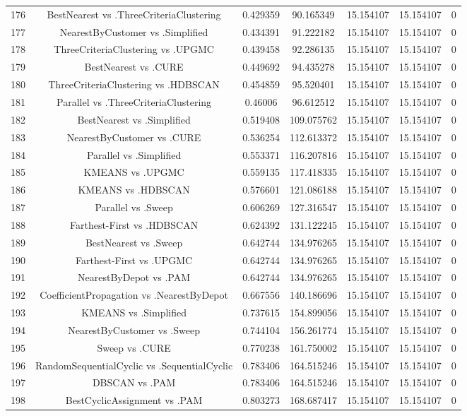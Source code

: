 \documentclass[a4paper,10pt]{article}
\begin{document}
\begin{landscape}
\begin{table}[!htp]
\begin{tabular}{ccccccc}
176&BestNearest vs .ThreeCriteriaClustering&0.429359&90.165349&15.154107&15.154107&0\\
177&NearestByCustomer vs .Simplified&0.434391&91.222182&15.154107&15.154107&0\\
178&ThreeCriteriaClustering vs .UPGMC&0.439458&92.286135&15.154107&15.154107&0\\
179&BestNearest vs .CURE&0.449692&94.435278&15.154107&15.154107&0\\
180&ThreeCriteriaClustering vs .HDBSCAN&0.454859&95.520401&15.154107&15.154107&0\\
181&Parallel vs .ThreeCriteriaClustering&0.46006&96.612512&15.154107&15.154107&0\\
182&BestNearest vs .Simplified&0.519408&109.075762&15.154107&15.154107&0\\
183&NearestByCustomer vs .CURE&0.536254&112.613372&15.154107&15.154107&0\\
184&Parallel vs .Simplified&0.553371&116.207816&15.154107&15.154107&0\\
185&KMEANS vs .UPGMC&0.559135&117.418335&15.154107&15.154107&0\\
186&KMEANS vs .HDBSCAN&0.576601&121.086188&15.154107&15.154107&0\\
187&Parallel vs .Sweep&0.606269&127.316547&15.154107&15.154107&0\\
188&Farthest-First vs .HDBSCAN&0.624392&131.122245&15.154107&15.154107&0\\
189&BestNearest vs .Sweep&0.642744&134.976265&15.154107&15.154107&0\\
190&Farthest-First vs .UPGMC&0.642744&134.976265&15.154107&15.154107&0\\
191&NearestByDepot vs .PAM&0.642744&134.976265&15.154107&15.154107&0\\
192&CoefficientPropagation vs .NearestByDepot&0.667556&140.186696&15.154107&15.154107&0\\
193&KMEANS vs .Simplified&0.737615&154.899056&15.154107&15.154107&0\\
194&NearestByCustomer vs .Sweep&0.744104&156.261774&15.154107&15.154107&0\\
195&Sweep vs .CURE&0.770238&161.750002&15.154107&15.154107&0\\
196&RandomSequentialCyclic vs .SequentialCyclic&0.783406&164.515246&15.154107&15.154107&0\\
197&DBSCAN vs .PAM&0.783406&164.515246&15.154107&15.154107&0\\
198&BestCyclicAssignment vs .PAM&0.803273&168.687417&15.154107&15.154107&0\\

\end{tabular}
\end{table}
\end{landscape}
\end{document}
